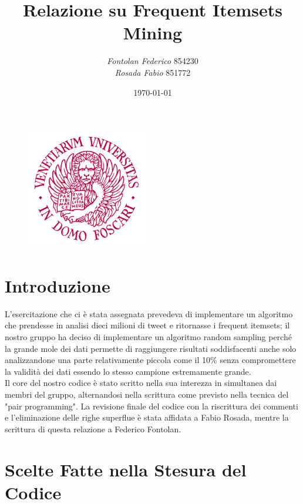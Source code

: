 \documentclass{article}
\title{\textbf{Relazione su Frequent Itemsets Mining\\}}
\date{\today}
\author{ \textit{Fontolan Federico} 854230\\\textit{Rosada Fabio} 851772\\}
\begin{document}
\maketitle
\begin{figure}[t!]
  \begin{center}
  \includegraphics[width=200px]{logo_ca_foscari.jpg}
  \end{center}
\end{figure}
\vfill
\newpage



\section{Introduzione}
L'esercitazione che ci è stata assegnata prevedeva di implementare un algoritmo che prendesse in analisi dieci milioni di tweet e ritornasse i frequent itemsets; il nostro gruppo ha deciso di implementare un algoritmo random sampling perché la grande mole dei dati permette di raggiungere risultati soddisfacenti anche solo analizzandone una parte relativamente piccola come il 10\% senza compromettere la validità dei dati essendo lo stesso campione estremamente grande.\\
Il core del nostro codice è stato scritto nella sua interezza in simultanea dai membri del gruppo, alternandosi nella scrittura come previsto nella tecnica del "pair programming". La revisione finale del codice con la riscrittura dei commenti e l'eliminazione delle righe superflue è stata affidata a Fabio Rosada, mentre la scrittura di questa relazione a Federico Fontolan.

\section{Scelte Fatte nella Stesura del Codice}
\end{document}
